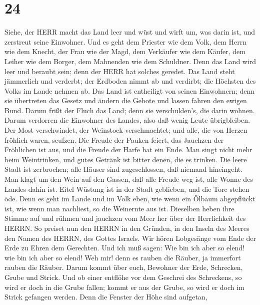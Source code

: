 \hypertarget{section-23}{%
\section{24}\label{section-23}}

 Siehe, der HERR macht das Land leer und wüst und wirft um,
was darin ist, und zerstreut seine Einwohner.  Und es geht
dem Priester wie dem Volk, dem Herrn wie dem Knecht, der Frau wie der
Magd, dem Verkäufer wie dem Käufer, dem Leiher wie dem Borger, dem
Mahnenden wie dem Schuldner.  Denn das Land wird leer und
beraubt sein; denn der HERR hat solches geredet.  Das Land
steht jämmerlich und verderbt; der Erdboden nimmt ab und verdirbt; die
Höchsten des Volks im Lande nehmen ab.  Das Land ist
entheiligt von seinen Einwohnern; denn sie übertreten das Gesetz und
ändern die Gebote und lassen fahren den ewigen Bund.  Darum
frißt der Fluch das Land; denn sie verschulden's, die darin wohnen.
Darum verdorren die Einwohner des Landes, also daß wenig Leute
übrigbleiben.  Der Most verschwindet, der Weinstock
verschmachtet; und alle, die von Herzen fröhlich waren, seufzen.
 Die Freude der Pauken feiert, das Jauchzen der Fröhlichen
ist aus, und die Freude der Harfe hat ein Ende.  Man singt
nicht mehr beim Weintrinken, und gutes Getränk ist bitter denen, die es
trinken.  Die leere Stadt ist zerbrochen; alle Häuser sind
zugeschlossen, daß niemand hineingeht.  Man klagt um den
Wein auf den Gassen, daß alle Freude weg ist, alle Wonne des Landes
dahin ist.  Eitel Wüstung ist in der Stadt geblieben, und
die Tore stehen öde.  Denn es geht im Lande und im Volk
eben, wie wenn ein Ölbaum abgepflückt ist, wie wenn man nachliest, so
die Weinernte aus ist.  Dieselben heben ihre Stimme auf und
rühmen und jauchzen vom Meer her über der Herrlichkeit des HERRN.
 So preiset nun den HERRN in den Gründen, in den Inseln des
Meeres den Namen des HERRN, des Gottes Israels.  Wir hören
Lobgesänge vom Ende der Erde zu Ehren dem Gerechten. Und ich muß sagen:
Wie bin ich aber so elend! wie bin ich aber so elend! Weh mir! denn es
rauben die Räuber, ja immerfort rauben die Räuber.  Darum
kommt über euch, Bewohner der Erde, Schrecken, Grube und Strick.
 Und ob einer entflöhe vor dem Geschrei des Schreckens, so
wird er doch in die Grube fallen; kommt er aus der Grube, so wird er
doch im Strick gefangen werden. Denn die Fenster der Höhe sind aufgetan,
